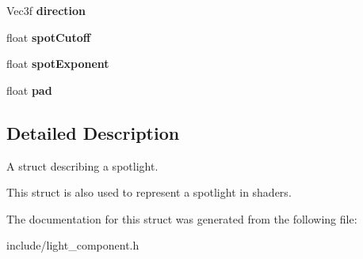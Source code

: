 \begin{DoxyCompactItemize}
\mbox{\label{struct_blade_1_1_spotlight_desc_affe8fca1efda80035a7a6f4a6a45ca66}} 
Vec3f {\bfseries direction}
\item 
\mbox{\label{struct_blade_1_1_spotlight_desc_afa8cbf4f2220555d7af2dd4a276aa06f}} 
float {\bfseries spot\+Cutoff}
\item 
\mbox{\label{struct_blade_1_1_spotlight_desc_a31796f472624e67f2256743fff5fd5fc}} 
float {\bfseries spot\+Exponent}
\item 
\mbox{\label{struct_blade_1_1_spotlight_desc_a06cbe79bc6fdb6ec22300ce837707bf8}} 
float {\bfseries pad}
\end{DoxyCompactItemize}


\subsection{Detailed Description}
A struct describing a spotlight. 

This struct is also used to represent a spotlight in shaders. 

The documentation for this struct was generated from the following file\+:\begin{DoxyCompactItemize}
\item 
include/light\+\_\+component.\+h\end{DoxyCompactItemize}
